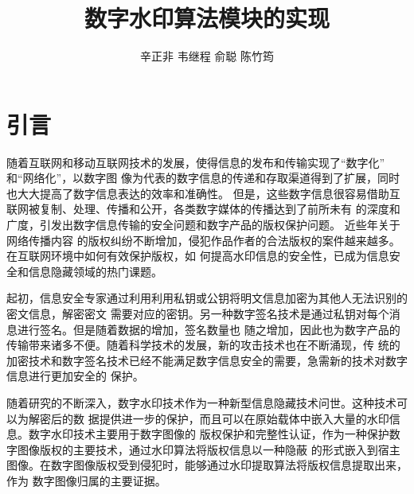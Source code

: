 \documentclass[a4paper,zihao=5,UTF8]{ctexart}
\title{\Large\CJKfamily{zhkai} 数字水印算法模块的实现}
\author{
        \zihao{-4}
        辛正非\quad 
        韦继程\quad 
        俞聪\quad 
        陈竹筠\quad 
    }
\affil{（
    \zihao{-5}
    {上海第二工业大学\quad{}上海\quad{}201209} 
）}
\date{}
\begin{document}
	\maketitle
	{
	}
    
    \noindent{}

    \noindent{}

\section{引言}

随着互联网和移动互联网技术的发展，使得信息的发布和传输实现了“数字化”
和“网络化”，以数字图
像为代表的数字信息的传递和存取渠道得到了扩展，同时也大大提高了数字信息表达的效率和准确性。
但是，这些数字信息很容易借助互联网被复制、处理、传播和公开，各类数字媒体的传播达到了前所未有
的深度和广度，引发出数字信息传输的安全问题和数字产品的版权保护问题。 近些年关于网络传播内容
的版权纠纷不断增加，侵犯作品作者的合法版权的案件越来越多。在互联网环境中如何有效保护版权，如
何提高水印信息的安全性，已成为信息安全和信息隐藏领域的热门课题。

起初，信息安全专家通过利用利用私钥或公钥将明文信息加密为其他人无法识别的密文信息，解密密文
需要对应的密钥。另一种数字签名技术是通过私钥对每个消息进行签名。但是随着数据的增加，签名数量也
随之增加，因此也为数字产品的传输带来诸多不便。随着科学技术的发展，新的攻击技术也在不断涌现，传
统的加密技术和数字签名技术已经不能满足数字信息安全的需要，急需新的技术对数字信息进行更加安全的
保护。

随着研究的不断深入，数字水印技术作为一种新型信息隐藏技术问世。这种技术可以为解密后的数
据提供进一步的保护，而且可以在原始载体中嵌入大量的水印信息。数字水印技术主要用于数字图像的
版权保护和完整性认证，作为一种保护数字图像版权的主要技术，通过水印算法将版权信息以一种隐蔽
的形式嵌入到宿主图像。在数字图像版权受到侵犯时，能够通过水印提取算法将版权信息提取出来，作为
数字图像归属的主要证据。
\end{document}
